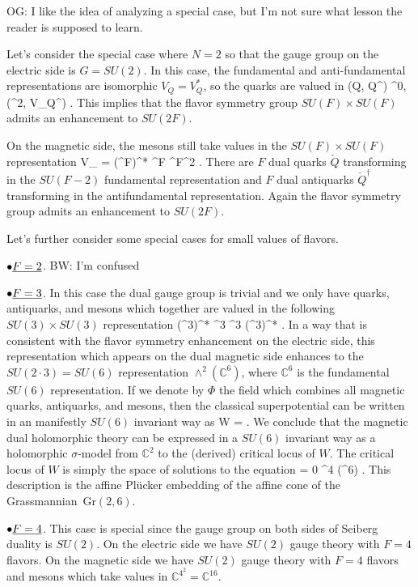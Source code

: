 \documentclass[11pt]{amsart}
\def\C{{\mathbb{C}}}
\def\brian#1{{\textcolor{blue!65!red}{BW: {#1}}}}
\def\owen#1{{\textcolor{violet!65!black}{OG: {#1}}}}
\begin{document}
\owen{I like the idea of analyzing a special case, but I'm not sure what lesson the reader is supposed to learn.}

Let's consider the special case where $N=2$ so that the gauge group on the electric side is $G = SU(2)$. 
In this case, the fundamental and anti-fundamental representations are isomorphic $V_Q = V^*_Q$, so the quarks are valued in
\beqn
(Q, Q^\dagger) \in \Omega^{0,\bu}(\CC^2, V_Q^{}) .
\eeqn
This implies that the flavor symmetry group $SU(F) \times SU(F)$ admits an enhancement to $SU(2F)$. 

On the magnetic side, the mesons still take values in the $SU(F) \times SU(F)$ representation
\beqn
V_{} = (\CC^F)^* \otimes \CC^F \cong \CC^{\oplus F^2} .
\eeqn
There are $F$ dual quarks $\check{Q}$ transforming in the $SU(F-2)$ fundamental representation and $F$ dual antiquarks $\check{Q}^\dagger$ transforming in the antifundamental representation. 
Again the flavor symmetry group admits an enhancement to $SU(2F)$.

Let's further consider some special cases for small values of flavors. 

$\bullet \smash{\underline{F=2}}$. \brian{I'm confused}

$\bullet \smash{\underline{F=3}}$. 
In this case the dual gauge group is trivial and we only have quarks, antiquarks, and mesons which together are valued in the following $SU(3) \times SU(3)$ representation
\beqn
(\CC^3)^* \otimes \CC^3 \oplus \CC^3 \oplus (\CC^3)^* .
\eeqn
In a way that is consistent with the flavor symmetry enhancement on the electric side, this representation which appears on the dual magnetic side enhances to the $SU(2 \cdot 3) = SU(6)$ representation $\wedge^2 (\C^6)$, where $\C^6$ is the fundamental $SU(6)$ representation.
If we denote by $\Phi$ the field which combines all magnetic quarks, antiquarks, and mesons, then the classical superpotential can be written in an manifestly $SU(6)$ invariant way as
\beqn
W =  \Phi \wedge \Phi \wedge \Phi .
\eeqn
We conclude that the magnetic dual holomorphic theory can be expressed in a $SU(6)$ invariant way as a holomorphic $\sigma$-model from $\C^2$ to the (derived) critical locus of $W$. 
The critical locus of $W$ is simply the space of solutions to the equation
\beqn
\Phi \wedge \Phi = 0 \in \wedge^4 (\C^6) .
\eeqn
This description is the affine Pl\"ucker embedding of the affine cone of the Grassmannian~$\text{Gr}(2,6)$.

$\bullet \smash{\underline{F=4}}$.
This case is special since the gauge group on both sides of Seiberg duality is $SU(2)$. 
On the electric side we have $SU(2)$ gauge theory with $F=4$ flavors. 
On the magnetic side we have $SU(2)$ gauge theory with $F=4$ flavors and mesons which take values in $\C^{4^2} = \C^{16}$.
\end{document}

